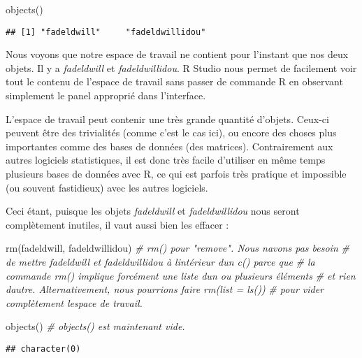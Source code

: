 \documentclass[
]{book}
\newenvironment{Shaded}{\begin{snugshade}}{\end{snugshade}}
\newcommand{\CommentTok}[1]{\textcolor[rgb]{0.56,0.35,0.01}{\textit{#1}}}
\newcommand{\FunctionTok}[1]{\textcolor[rgb]{0.00,0.00,0.00}{#1}}
\newcommand{\NormalTok}[1]{#1}
\begin{document}
\begin{Shaded}
\begin{Highlighting}[]
\FunctionTok{objects}\NormalTok{()}
\end{Highlighting}
\end{Shaded}

\begin{verbatim}
## [1] "fadeldwill"     "fadeldwillidou"
\end{verbatim}

Nous voyons que notre espace de travail ne contient pour l'instant que nos deux objets. Il y a \emph{fadeldwill} et \emph{fadeldwillidou}. R Studio nous permet de facilement voir tout le contenu de l'espace de travail sans passer de commande R en observant simplement le panel approprié dans l'interface.

L'espace de travail peut contenir une très grande quantité d'objets. Ceux-ci peuvent être des trivialités (comme c'est le cas ici), ou encore des choses plus importantes comme des bases de données (des matrices). Contrairement aux autres logiciels statistiques, il est donc très facile d'utiliser en même temps plusieurs bases de données avec R, ce qui est parfois très pratique et impossible (ou souvent fastidieux) avec les autres logiciels.

Ceci étant, puisque les objets \emph{fadeldwill} et \emph{fadeldwillidou} nous seront complètement inutiles, il vaut aussi bien les effacer :

\begin{Shaded}
\begin{Highlighting}[]
\FunctionTok{rm}\NormalTok{(fadeldwill, fadeldwillidou) }\CommentTok{\# rm() pour "remove". Nous n\textquotesingle{}avons pas besoin}
\CommentTok{\# de mettre fadeldwill et fadeldwillidou à l\textquotesingle{}intérieur d\textquotesingle{}un c() parce que}
\CommentTok{\# la commande rm() implique forcément une liste d\textquotesingle{}un ou plusieurs éléments}
\CommentTok{\# et rien d\textquotesingle{}autre. Alternativement, nous pourrions faire rm(list = ls())}
\CommentTok{\# pour vider complètement l\textquotesingle{}espace de travail.}

\FunctionTok{objects}\NormalTok{() }\CommentTok{\# objects() est maintenant vide.}
\end{Highlighting}
\end{Shaded}

\begin{verbatim}
## character(0)
\end{verbatim}
\end{document}
